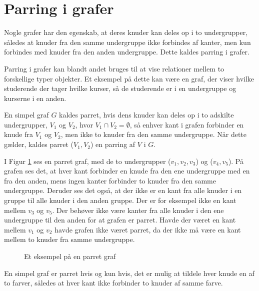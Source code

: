 \section{Parring i grafer}
Nogle grafer har den egenskab, at deres knuder kan deles op i to undergrupper, således at knuder fra den samme undergruppe ikke forbindes af kanter, men kun forbindes med knuder fra den anden undergruppe.
Dette kaldes parring i grafer.

Parring i grafer kan blandt andet bruges til at vise relationer mellem to forskellige typer objekter.
Et eksempel på dette kan være en graf, der viser hvilke studerende der tager hvilke kurser, så de studerende er i en undergruppe og kurserne i en anden. 

\begin{defn}
	En simpel graf $G$ kaldes parret, hvis dens knuder kan deles op i to adskilte undergrupper, $V_1$ og $V_2$, hvor $V_1 \cap V_2 = \emptyset$, så enhver kant i grafen forbinder en knude fra $V_1$ og $V_2$, men ikke to knuder fra den samme undergruppe.
	Når dette gælder, kaldes parret ($V_1,V_2$) en parring af $V$ i $G$.
\end{defn}

\begin{exmp}
	I Figur \ref{parret_graf} ses en parret graf, med de to undergrupper ($v_1,v_2,v_3$) og ($v_4,v_5$). 
	På grafen ses det, at hver kant forbinder en knude fra den ene undergruppe med en fra den anden, mens ingen kanter forbinder to knuder fra den samme undergruppe. 
	Deruder ses det også, at der ikke er en kant fra alle knuder i en gruppe til alle knuder i den anden gruppe.
	Der er for eksempel ikke en kant mellem $v_3$ og $v_5$. 
	Der behøver ikke være kanter fra alle knuder i den ene undergruppe til den anden for at grafen er parret.
	Havde der været en kant mellem $v_1$ og $v_2$ havde grafen ikke været parret, da der ikke må være en kant mellem to knuder fra samme undergruppe.
\end{exmp}

\begin{figure}[h]
	\centering
	
	\caption{Et eksempel på en parret graf} \label{parret_graf}
\end{figure}

\begin{thm}
	En simpel graf er parret hvis og kun hvis, det er mulig at tildele hver knude en af to farver, således at hver kant ikke forbinder to knuder af samme farve. 
\label{farve_satning}
\end{thm}

